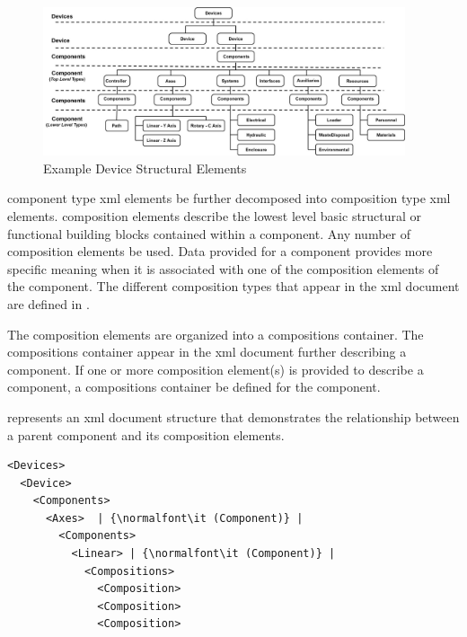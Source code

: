 \begin{figure}[ht]
  \centering
  \includegraphics[width=0.95\textwidth]{figures/devices-structural-elements.png}
  \caption{Example Device Structural Elements}
  \label{fig:mtconnect-devices-structural-elements}
\end{figure}

\FloatBarrier

\gls{component} type \gls{xml} elements \may be further decomposed into \gls{composition} type \gls{xml} elements. \gls{composition} elements describe the lowest level basic structural or functional building blocks contained within a \gls{component}. Any number of \gls{composition} elements \may be used. Data provided for a \gls{component} provides more specific meaning when it is associated with one of the \gls{composition} elements of the \gls{component}.  The different \gls{composition} types that \may appear in the \gls{xml} document are defined in .

The \gls{composition} elements are organized into a \gls{compositions} container.  The \gls{compositions} container \may appear in the \gls{xml} document further describing a \gls{component}. If one or more \gls{composition} element(s) is provided to describe a \gls{component}, a \gls{compositions} container \MUST be defined for the \gls{component}.

 represents an \gls{xml} document structure that demonstrates the relationship between a parent \gls{component} and its \gls{composition} elements.

\begin{lstlisting}[firstnumber=1,escapechar=|,%
    caption={Component levels with Composition},label={lst:component-levels-with-composition}]
<Devices>
  <Device>
    <Components>
      <Axes>  | {\normalfont\it (Component)} |
        <Components>
          <Linear> | {\normalfont\it (Component)} |
            <Compositions>
              <Composition>
              <Composition>
              <Composition>
\end{lstlisting}

